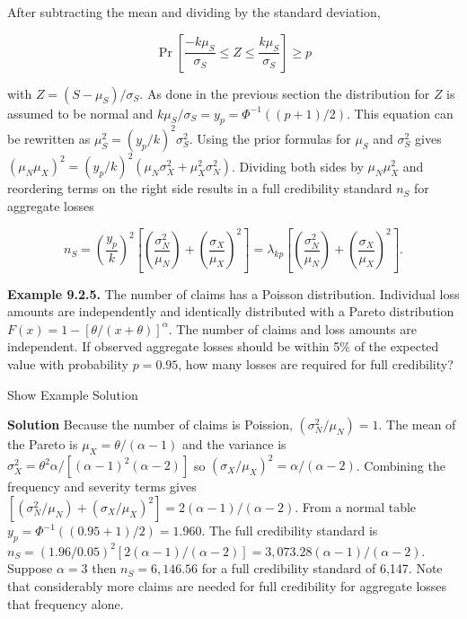 \documentclass[]{book}
\theoremstyle{definition}
\theoremstyle{definition}
\theoremstyle{definition}
\theoremstyle{remark}
\begin{document}
\noindent After subtracting the mean and dividing by the standard
deviation,

\begin{equation*}
\Pr\left[\frac{-k\mu_S}{\sigma_S}\leq Z \leq \frac{k\mu_S}{\sigma_S}\right] \geq p
\end{equation*}

with \(Z = (S-\mu_S)/\sigma_S\). As done in the previous section the
distribution for \(Z\) is assumed to be normal and
\(k\mu_S/\sigma_S=y_p=\Phi^{-1}((p+1)/2)\). This equation can be
rewritten as \(\mu_S^2=(y_p/k)^2\sigma_S^2\). Using the prior formulas
for \(\mu_S\) and \(\sigma_{S}^2\) gives
\((\mu_N\mu_X)^2=(y_p/k)^2(\mu_N\sigma^{2}_X+\mu^{2}_X\sigma^{2}_N)\).
Dividing both sides by \(\mu_N\mu_X^2\) and reordering terms on the
right side results in a full credibility standard \(n_S\) for aggregate
losses

\begin{equation}
n_S=\left(\frac{y_p}{k}\right)^2\left[\left(\frac{\sigma_N^2}{\mu_N}\right)+\left(\frac{\sigma_X}{\mu_X}\right)^2\right]=\lambda_{kp}\left[\left(\frac{\sigma_N^2}{\mu_N}\right)+\left(\frac{\sigma_X}{\mu_X}\right)^2\right].
\label{eq:full-credibility-losses}
\end{equation}

\textbf{Example 9.2.5.} The number of claims has a Poisson distribution.
Individual loss amounts are independently and identically distributed
with a Pareto distribution \(F(x)=1-[\theta/(x+\theta)]^{\alpha}\). The
number of claims and loss amounts are independent. If observed aggregate
losses should be within 5\(\%\) of the expected value with probability
\(p=0.95\), how many losses are required for full credibility?

Show Example Solution

\hypertarget{toggleExampleCred.2.5}{}
\textbf{Solution} Because the number of claims is Poission,
\((\sigma_N^2/\mu_N)=1\). The mean of the Pareto is
\(\mu_X=\theta/(\alpha-1)\) and the variance is
\(\sigma_X^2=\theta^{2}\alpha/[(\alpha-1)^{2}(\alpha-2)]\) so
\((\sigma_X/\mu_X)^2=\alpha/(\alpha-2)\). Combining the frequency and
severity terms gives
\([(\sigma_N^2/\mu_N)+(\sigma_X/\mu_X)^2]=2(\alpha-1)/(\alpha-2)\). From
a normal table \(y_p=\Phi^{-1}((0.95+1)/2)=1.960\). The full credibility
standard is
\(n_S=(1.96/0.05)^{2}[2(\alpha-1)/(\alpha-2)]=3,073.28(\alpha-1)/(\alpha-2)\).
Suppose \(\alpha=3\) then \(n_S=6,146.56\) for a full credibility
standard of 6,147. Note that considerably more claims are needed for
full credibility for aggregate losses that frequency alone.
\end{document}

